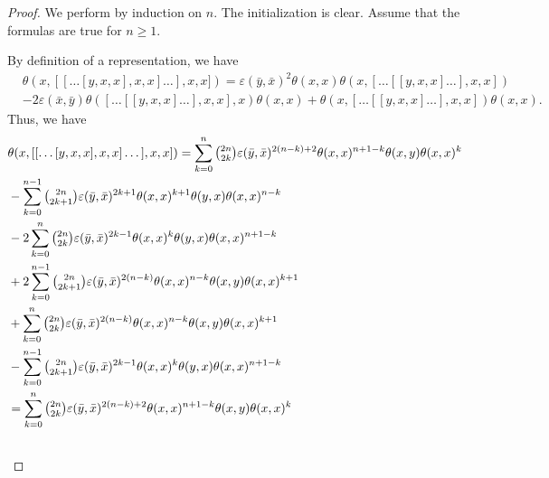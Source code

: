 \documentclass[11pt, twoside]{article}
\begin{document}
\begin{proof}
   We perform by induction on $n$. The initialization is clear. Assume that the formulas are true for $n\geq 1$.

 By definition of a representation, we have \begin{align*}
     &\theta(x,[[\dots[y,x,x],x,x]\dots],x,x])= \varepsilon(\bar{y},\bar{x})^2\theta(x,x)\theta(x,[\dots[[y,x,x]\dots],x,x]) 
     \\& 
-2\varepsilon(\bar{x},\bar{y})\theta([\dots[[y,x,x]\dots],x,x],x)\theta(x,x)
+\theta(x,[\dots[[y,x,x]\dots],x,x])\theta(x,x) .
 \end{align*} Thus, we have 
    \begin{align*}
     &\theta(x,[[\dots[y,x,x],x,x]\dots],x,x]) = \sum\limits_{k=0}^n\tbinom{2n}{2k}\varepsilon(\bar{y},\bar{x})^{2(n-k)+2}\theta(x,x)^{n+1-k}\theta(x,y)\theta(x,x)^k \\ & - \sum\limits_{k=0}^{n-1}\tbinom{2n}{2k+1}\varepsilon(\bar{y},\bar{x})^{2k+1}\theta(x,x)^{k+1}\theta(y,x)\theta(x,x)^{n-k} 
     \\ &
     - 2\sum\limits_{k=0}^n\tbinom{2n}{2k}\varepsilon(\bar{y},\bar{x})^{2k-1}\theta(x,x)^k\theta(y,x)\theta(x,x)^{n+1-k} \\ & +2 \sum\limits_{k=0}^{n-1}\tbinom{2n}{2k+1}\varepsilon(\bar{y},\bar{x})^{2(n-k)}\theta(x,x)^{n-k}\theta(x,y)\theta(x,x)^{k+1} 
     \\ &
     + \sum\limits_{k=0}^n\tbinom{2n}{2k}\varepsilon(\bar{y},\bar{x})^{2(n-k)}\theta(x,x)^{n-k}\theta(x,y)\theta(x,x)^{k+1} \\ &- \sum\limits_{k=0}^{n-1}\tbinom{2n}{2k+1}\varepsilon(\bar{y},\bar{x})^{2k-1}\theta(x,x)^k\theta(y,x)\theta(x,x)^{n+1-k} \\ & = \sum\limits_{k=0}^n\tbinom{2n}{2k}\varepsilon(\bar{y},\bar{x})^{2(n-k)+2}\theta(x,x)^{n+1-k}\theta(x,y)\theta(x,x)^k  
     \\ &

\end{align*}
\end{proof}
\end{document}
